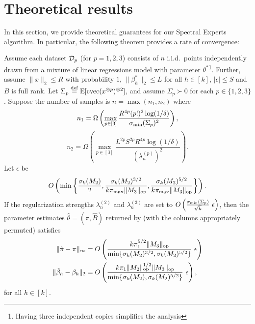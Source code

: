 \section{Theoretical results}
\label{sec:theory}

In this section, we provide theoretical guarantees for our Spectral Experts algorithm.
In particular, the following theorem provides a rate of convergence:

\begin{theorem}
\label{thm:convergence}
Assume each dataset $\mathcal{D}_p$ (for $p = 1, 2, 3$) consists of $n$ i.i.d.\ points independently drawn from a mixture
of linear regressions model with parameter $\theta^*$\footnote{Having three independent copies simplifies the analysis}.
Further, assume 
$\|x\|_2 \le R$ with probability $1$, 
$\|\beta_h^*\|_2 \le L$ for all $h \in [k]$,
$|\epsilon| \le S$
and $B$ is full rank.
Let $\Sigma_p \stackrel{\rm def}{=} \operatorname{\mathbb{E}}[\operatorname{cvec}(x^{\otimes p})^{\otimes 2}]$, 
and assume $\Sigma_p \succ 0$ for each $p \in \{1,2,3\}$.
Suppose the number of samples is
$n = \max(n_1,n_2)$
where 
$$n_1 = \Omega \left(\max_{p \in [3]} \frac{R^{4p} (p!)^2 \log(1/\delta)}{\sigma_\text{\rm min}(\Sigma_p)^2} \right),$$
$$n_2 = \Omega \left(\max_{p\in [3]} \frac{L^{2p} S^{2p} R^{4p} \log(1/\delta)}{\left(\lambda_n^{(p)}\right)^2} \right).$$
Let $\epsilon$ be 
$$O\left( \min\left\{ 
    \frac{\sigma_k(M_2)}{2}, 
    \frac{\sigma_k(M_2)^{3/2}}{k \pi_{\max} \|M_3\|_{\textrm{op}}},
    \frac{\sigma_k(M_2)^{5/2}}{k \pi_{\max} \|M_3\|_{\textrm{op}}} 
    \right\}\right).$$ 
If the regularization strengths $\lambda_n^{(2)}$ and $\lambda_n^{(3)}$ are
set to $O\left(\frac{\sigma_\text{\rm min}(\Sigma_p)}{\sqrt{k}}~ \epsilon \right)$, 
then the parameter estimates $\hat\theta = (\hat\pi, \hat B)$ returned by
 (with the columns appropriately permuted)
satisfies 
  \begin{align*}
  \|\hat \pi - \pi \|_{\infty}
  &= O\left(\frac{k \pi_1^{5/2}\| {M_3} \|_{\textrm{op}}}{\min\{ \sigma_k(M_2)^{3/2}, \sigma_k(M_2)^{5/2} \}} ~ \epsilon \right) \\
  \|\hat \beta_h - \beta_h\|_2
  &= O\left( \frac{k \pi_1 \|M_2\|_{\textrm{op}}^{1/2} \| {M_3} \|_{\textrm{op}}}{\min\{ \sigma_k(M_2), \sigma_k(M_2)^{5/2} \}}~ \epsilon \right),
  \end{align*}
  for all $h \in [k]$.
\end{theorem}

